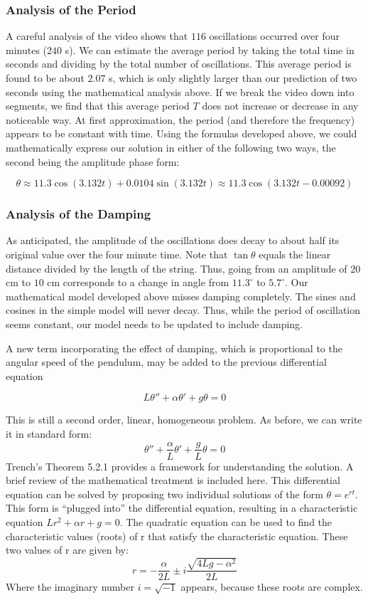 \documentclass{ximera}
\begin{document}

\subsubsection*{Analysis of the Period}

A careful analysis of the video shows that $116$ oscillations occurred over four minutes ($240$ s).  We can estimate the average period by taking the total time in seconds and dividing by the total number of oscillations.  This average period is found to be about $2.07$ s, which is only slightly larger than our prediction of two seconds using the mathematical analysis above.  If we break the video down into segments, we find that this average period $T$ does not increase or decrease in any noticeable way.  At first approximation, the period (and therefore the frequency) appears to be constant with time.  Using the formulas developed above, we could mathematically express our solution in either of the following two ways, the second being the amplitude phase form:

$$\theta\approx 11.3\cos (3.132t)+0.0104\sin (3.132t)\approx 11.3\cos(3.132t-0.00092)$$

\subsubsection*{Analysis of the Damping}

As anticipated, the amplitude of the oscillations does decay to about half its original value over the four minute time.  Note that $\tan\theta$ equals the linear distance divided by the length of the string.  Thus, going from an amplitude of $20$ cm to $10$ cm corresponds to a change in angle from $11.3^\circ$ to $5.7^\circ$.  Our mathematical model developed above misses damping completely.  The sines and cosines in the simple model will never decay.  Thus, while the period of oscillation seems constant, our model needs to be updated to include damping.

A new term incorporating the effect of damping, which is proportional to the angular speed of the pendulum, may be added to the previous differential equation

$$L\theta''+\alpha\theta'+g\theta=0$$

This is still a second order, linear, homogeneous problem.  As before, we can write it in standard form:
$$\theta''+\frac{\alpha}{L}\theta'+\frac{g}{L}\theta=0$$
Trench’s Theorem 5.2.1 provides a framework for understanding the solution.  A brief review of the mathematical treatment is included here.  This differential equation can be solved by proposing two individual solutions of the form $\theta=e^{rt}$.  This form is “plugged into” the differential equation, resulting in a characteristic equation $Lr^2+\alpha r+g=0$.  The quadratic equation can be used to find the characteristic values (roots) of r that satisfy the characteristic equation.  These two values of r are given by:
$$r=-\frac{\alpha}{2L}\pm i\frac{\sqrt{4Lg-\alpha^2}}{2L}$$
Where the imaginary number $i=\sqrt{-1}$ appears, because these roots are complex.
\end{document}
